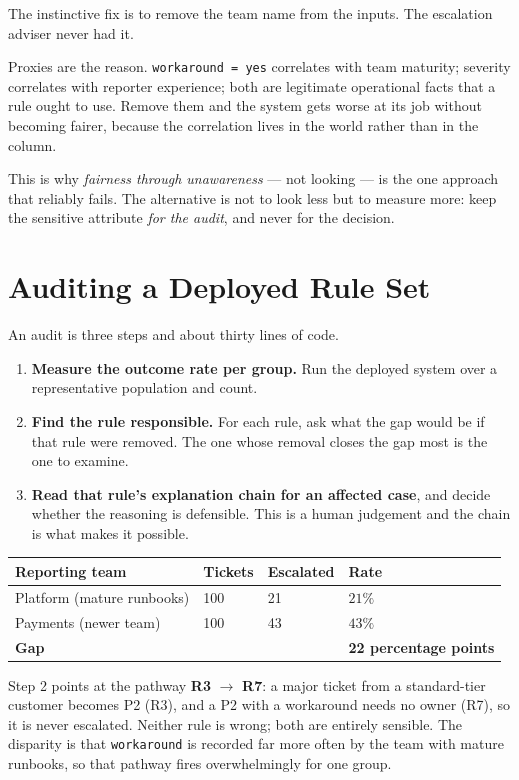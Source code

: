 \begin{alertbox}
The instinctive fix is to remove the team name from the inputs. The escalation
adviser never had it.

Proxies are the reason. \texttt{workaround = yes} correlates with team maturity;
severity correlates with reporter experience; both are legitimate operational facts
that a rule ought to use. Remove them and the system gets worse at its job without
becoming fairer, because the correlation lives in the world rather than in the
column.

This is why \emph{fairness through unawareness} --- not looking --- is the one
approach that reliably fails. The alternative is not to look less but to measure
more: keep the sensitive attribute \emph{for the audit}, and never for the decision.
\end{alertbox}

\section{Auditing a Deployed Rule Set}

An audit is three steps and about thirty lines of code.

\begin{enumerate}[leftmargin=2.2em, itemsep=3pt, topsep=4pt]
  \item \textbf{Measure the outcome rate per group.} Run the deployed system over a
        representative population and count.
  \item \textbf{Find the rule responsible.} For each rule, ask what the gap would be
        if that rule were removed. The one whose removal closes the gap most is the
        one to examine.
  \item \textbf{Read that rule's explanation chain for an affected case}, and decide
        whether the reasoning is defensible. This is a human judgement and the
        chain is what makes it possible.
\end{enumerate}

\begin{examplebox}
\begin{tabular}{@{}L{4.2cm}L{2.2cm}L{2.4cm}L{4.8cm}@{}}
\toprule
\textbf{Reporting team} & \textbf{Tickets} & \textbf{Escalated} &
\textbf{Rate} \\
\midrule
Platform (mature runbooks) & 100 & 21 & $21\%$ \\
Payments (newer team) & 100 & 43 & $43\%$ \\
\midrule
\textbf{Gap} & & & \textbf{22 percentage points} \\
\bottomrule
\end{tabular}

\smallskip
Step 2 points at the pathway \textbf{R3} $\to$ \textbf{R7}: a major ticket from a
standard-tier customer becomes P2 (R3), and a P2 with a workaround needs no owner
(R7), so it is never escalated. Neither rule is wrong; both are entirely sensible.
The disparity is that \texttt{workaround} is recorded far more often by the team
with mature runbooks, so that pathway fires overwhelmingly for one group.
\end{examplebox}

